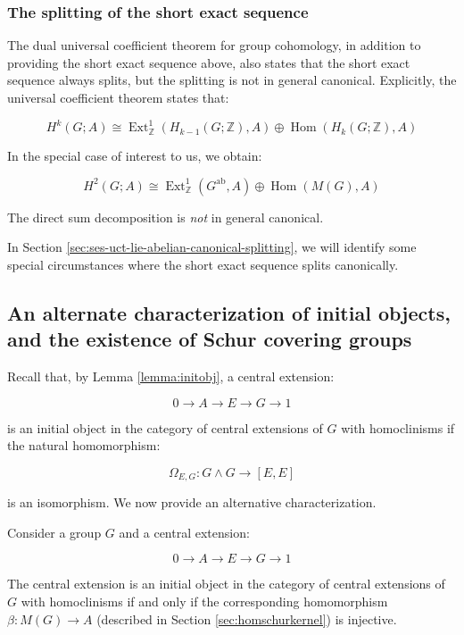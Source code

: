 \subsubsection{The splitting of the short exact sequence}\label{sec:ses-uct-non-canonical-splitting}

The dual universal coefficient theorem for group cohomology, in addition
to providing the short exact sequence above, also states that the
short exact sequence always splits, but the splitting is not in
general canonical. Explicitly, the universal coefficient theorem
states that:

$$H^k(G;A) \cong \operatorname{Ext}^1_{\mathbb{Z}}(H_{k-1}(G;\mathbb{Z}),A) \oplus \operatorname{Hom}(H_k(G;\mathbb{Z}),A)$$

In the special case of interest to us, we obtain:

$$H^2(G;A) \cong \operatorname{Ext}^1_{\mathbb{Z}}(G^{\operatorname{ab}},A) \oplus \operatorname{Hom}(M(G),A)$$

The direct sum decomposition is {\em not} in general canonical. %

In Section \ref{sec:ses-uct-lie-abelian-canonical-splitting}, we will
identify some special circumstances where the short exact sequence
splits canonically.

\subsection{An alternate characterization of initial objects, and the existence of Schur covering groups}

Recall that, by Lemma \ref{lemma:initobj}, a central extension:

$$0 \to A \to E \to G \to 1$$

is an initial object in the category of central extensions of $G$ with
homoclinisms if the natural homomorphism:

$$\Omega_{E,G}: G \wedge G \to [E,E]$$

is an isomorphism. We now provide an alternative characterization.

\begin{lemma}\label{lemma:initial-beta-injective}
  Consider a group $G$ and a central extension:

  $$0 \to A \to E \to G \to 1$$

  The central extension is an initial object in the category of
  central extensions of $G$ with homoclinisms if and only if the
  corresponding homomorphism $\beta:M(G) \to A$ (described in Section
  \ref{sec:homschurkernel}) is injective.
\end{lemma}


